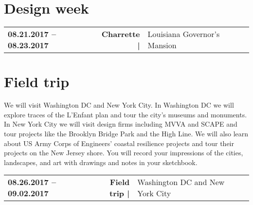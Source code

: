 \documentclass[11pt,article,oneside]{memoir}
\begin{document}
\section{Design week}

\begin{table}[H]
\small
\begin{tabular}{l r @{\hskip 0.1cm} l @{\hskip 0.5cm} l}
%
\textbf{08.21.2017 -- 08.23.2017} & \textbf{Charrette |} & Louisiana Governor's Mansion\\
%
\end{tabular}
\end{table}

\section{Field trip}

We will visit Washington DC and New York City. 
In Washington DC we will explore traces of the L'Enfant plan
and tour the city's museums and monuments.
In New York City we will visit design firms including 
MVVA and SCAPE 
and tour projects like the Brooklyn Bridge Park and the High Line.
We will also learn about 
US Army Corps of Engineers' coastal resilience projects
and tour their projects on the New Jersey shore.
You will record your impressions of the cities, landscapes, and art
with drawings and notes in your sketchbook.

\begin{table}[H]
\small
\begin{tabular}{l r @{\hskip 0.1cm} l @{\hskip 0.5cm} l}
%
\textbf{08.26.2017 -- 09.02.2017} & \textbf{Field trip |} & Washington DC and New York City\\
%
\end{tabular}
\end{table}

\end{document}
